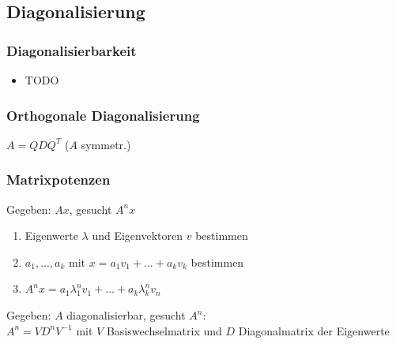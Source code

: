 \documentclass[german, fourcolumn, 8pt]{latex4ei/latex4ei_sheet}
\begin{document}
\subsection{Diagonalisierung}
\begin{sectionbox}
    \subsubsection{Diagonalisierbarkeit}
    \begin{itemize}
        \item TODO
    \end{itemize}

    \subsubsection{Orthogonale Diagonalisierung}
    $A=QDQ^T$ ($A$ symmetr.)
\end{sectionbox}

\begin{sectionbox}
    \subsubsection{Matrixpotenzen}
    Gegeben: $Ax$, gesucht $A^nx$
    \begin{enumerate}
        \item Eigenwerte $\lambda$ und Eigenvektoren $v$ bestimmen
        \item $a_1,...,a_k$ mit $x=a_1v_1+\dots+a_kv_k$ bestimmen
        \item $A^nx=a_1\lambda_1^nv_1+\dots+a_k\lambda_k^nv_n$
    \end{enumerate}

    Gegeben: $A$ diagonalisierbar, gesucht $A^n$: \\
    $A^n=VD^nV^{-1}$ mit $V$ Basiswechselmatrix und $D$ Diagonalmatrix der Eigenwerte
\end{sectionbox}
\end{document}
